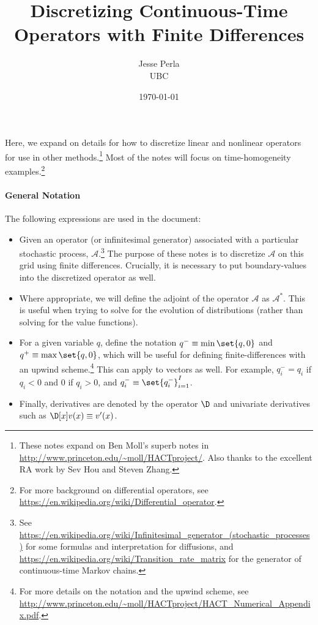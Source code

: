 \documentclass[11pt]{etk-article}
\begin{document}
\title{Discretizing Continuous-Time Operators with Finite Differences}
\author{Jesse Perla\\UBC}
\date{\today}
\maketitle
 Here, we expand on details for how to discretize linear and nonlinear operators for use in other methods.\footnote{These notes expand on Ben Moll's superb notes in \url{http://www.princeton.edu/~moll/HACTproject/}. Also thanks to the excellent RA work by Sev Hou and Steven Zhang.}  Most of the notes will focus on time-homogeneity examples.\footnote{For more background on differential operators, see \url{https://en.wikipedia.org/wiki/Differential_operator}.}
\paragraph{General Notation} The following expressions are used in the document:
\begin{itemize}
	\item Given an operator (or infinitesimal generator) associated with a particular stochastic process, $\mathcal{A}$.\footnote{See \url{https://en.wikipedia.org/wiki/Infinitesimal_generator_(stochastic_processes)} for some formulas and interpretation for diffusions, and \url{https://en.wikipedia.org/wiki/Transition_rate_matrix} for the generator of continuous-time Markov chains.}  The purpose of these notes is to discretize $\mathcal{A}$ on this grid using finite differences.  Crucially, it is necessary to put boundary-values into the discretized operator as well. 
	\item Where appropriate, we will define the adjoint of the operator $\mathcal{A}$ as $\mathcal{A}^*$.  This is useful when trying to solve for the evolution of distributions (rather than solving for the value functions).
	\item For a given variable $q$, define the notation $q^{-} \equiv \min\set{q,0}$ and $q^{+} \equiv \max\set{q,0}$, which will be useful for defining finite-differences with an upwind scheme.\footnote{For more details on the notation and the upwind scheme, see \url{http://www.princeton.edu/~moll/HACTproject/HACT_Numerical_Appendix.pdf}.}   This can apply to vectors as well. For example, $q_i^{-} = q_i$ if $q_i < 0$ and $0$ if $q_i > 0$, and $q_i^{-} \equiv \set{q^{-}_i}_{i=1}^{I}$.
	\item Finally,  derivatives are denoted by the operator $\D$ and univariate derivatives such as $\D[x]v(x) \equiv v'(x)$.	
\end{itemize}
\end{document}

